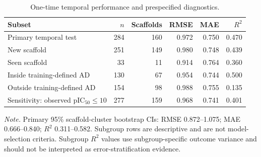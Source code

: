 \begin{table}[H]
\centering
\caption{One-time temporal performance and prespecified diagnostics.}
\label{tab:temporal}
\small
\begin{tabular}{L{0.40\textwidth}rrrrr}
\toprule
\textbf{Subset} & \textbf{$n$} & \textbf{Scaffolds} & \textbf{RMSE} & \textbf{MAE} & \textbf{$R^2$} \\
\midrule
Primary temporal test & 284 & 160 & 0.972 & 0.750 & 0.470 \\
New scaffold & 251 & 149 & 0.980 & 0.748 & 0.439 \\
Seen scaffold & 33 & 11 & 0.914 & 0.764 & 0.360 \\
Inside training-defined AD & 130 & 67 & 0.954 & 0.744 & 0.500 \\
Outside training-defined AD & 154 & 98 & 0.988 & 0.755 & 0.135 \\
Sensitivity: observed pIC$_{50}\leq 10$ & 277 & 159 & 0.968 & 0.741 & 0.401 \\
\bottomrule
\end{tabular}
\par\vspace{3pt}\parbox{0.94\textwidth}{\footnotesize \textit{Note.} Primary 95\% scaffold-cluster bootstrap CIs: RMSE 0.872--1.075; MAE 0.666--0.840; $R^2$ 0.311--0.582. Subgroup rows are descriptive and are not model-selection criteria. Subgroup $R^2$ values use subgroup-specific outcome variance and should not be interpreted as error-stratification evidence.}
\end{table}
